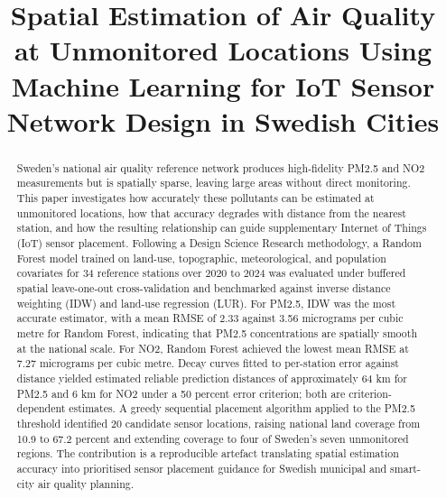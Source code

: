 \documentclass[conference]{IEEEtran}
\begin{document}
\title{Spatial Estimation of Air Quality at Unmonitored Locations Using
Machine Learning for IoT Sensor Network Design in Swedish Cities}

\author{
}

\maketitle

\begin{abstract}
Sweden's national air quality reference network produces high-fidelity PM2.5
and NO2 measurements but is spatially sparse, leaving large areas without
direct monitoring. This paper investigates how accurately these pollutants
can be estimated at unmonitored locations, how that accuracy degrades with
distance from the nearest station, and how the resulting relationship can
guide supplementary Internet of Things (IoT) sensor placement. Following a
Design Science Research methodology, a Random Forest model trained on
land-use, topographic, meteorological, and population covariates for 34
reference stations over 2020 to 2024 was evaluated under buffered spatial
leave-one-out cross-validation and benchmarked against inverse distance
weighting (IDW) and land-use regression (LUR). For PM2.5, IDW was the most
accurate estimator, with a mean RMSE of 2.33 against 3.56 micrograms per
cubic metre for Random Forest, indicating that PM2.5 concentrations are
spatially smooth at the national scale. For NO2, Random Forest achieved the
lowest mean RMSE at 7.27 micrograms per cubic metre. Decay curves fitted to
per-station error against distance yielded estimated reliable prediction
distances of approximately 64 km for PM2.5 and 6 km for NO2 under a 50
percent error criterion; both are criterion-dependent estimates. A greedy
sequential placement algorithm applied to the PM2.5 threshold identified 20
candidate sensor locations, raising national land coverage from 10.9 to 67.2
percent and extending coverage to four of Sweden's seven unmonitored regions.
The contribution is a reproducible artefact translating spatial estimation
accuracy into prioritised sensor placement guidance for Swedish municipal and
smart-city air quality planning.
\end{abstract}
\end{document}
